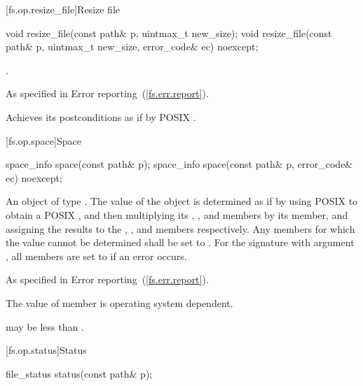 [fs.op.resize_file]{Resize file}

%
\begin{itemdecl}
void resize_file(const path& p, uintmax_t new_size);
void resize_file(const path& p, uintmax_t new_size, error_code& ec) noexcept;
\end{itemdecl}

\begin{itemdescr}
\pnum
\postcondition {}.

\pnum
\throws As specified in Error reporting~(\ref{fs.err.report}).

\pnum
\remarks Achieves its postconditions as if by POSIX .
\end{itemdescr}


[fs.op.space]{Space}

%
\begin{itemdecl}
space_info space(const path& p);
space_info space(const path& p, error_code& ec) noexcept;
\end{itemdecl}

\begin{itemdescr}
\pnum
\returns An object of type . The value of the 
  object is determined as if by using POSIX 
  to obtain a POSIX ,
  and then multiplying its , ,
  and  members by its  member,
  and assigning the results to the , ,
  and  members respectively. Any members for which the
  value cannot be determined shall be set to .
  For the signature with argument , all members are set to
   if an error occurs.

\pnum
\throws As specified in Error reporting~(\ref{fs.err.report}).

\pnum
\remarks The value of member 
      is operating system dependent. \begin{note}  may be
      less than . \end{note}
\end{itemdescr}


[fs.op.status]{Status}

%
\begin{itemdecl}
file_status status(const path& p);
\end{itemdecl}

